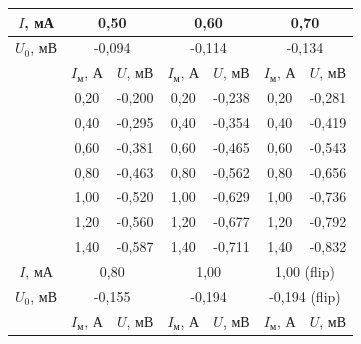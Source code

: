 \documentclass[a4paper,12pt]{article} %
\begin{document}
\begin{table}[H]
\begin{tabular}{l|cc|cc|cc|}
		\multicolumn{1}{|c|}{$I$, мА}   & \multicolumn{2}{c|}{0,50}                      & \multicolumn{2}{c|}{0,60}                      & \multicolumn{2}{c|}{0,70}                      \\ \hline
		\multicolumn{1}{|c|}{$U_0$, мВ} & \multicolumn{2}{c|}{-0,094}                    & \multicolumn{2}{c|}{-0,114}                    & \multicolumn{2}{c|}{-0,134}                    \\ \hline
		& \multicolumn{1}{c|}{$I_\text{м}$, А} & $U$, мВ & \multicolumn{1}{c|}{$I_\text{м}$, А} & $U$, мВ & \multicolumn{1}{c|}{$I_\text{м}$, А} & $U$, мВ \\ \cline{2-7} 
		& \multicolumn{1}{c|}{0,20}            & -0,200  & \multicolumn{1}{c|}{0,20}            & -0,238  & \multicolumn{1}{c|}{0,20}            & -0,281  \\ \cline{2-7} 
		& \multicolumn{1}{c|}{0,40}            & -0,295  & \multicolumn{1}{c|}{0,40}            & -0,354  & \multicolumn{1}{c|}{0,40}            & -0,419  \\ \cline{2-7} 
		& \multicolumn{1}{c|}{0,60}            & -0,381  & \multicolumn{1}{c|}{0,60}            & -0,465  & \multicolumn{1}{c|}{0,60}            & -0,543  \\ \cline{2-7} 
		& \multicolumn{1}{c|}{0,80}            & -0,463  & \multicolumn{1}{c|}{0,80}            & -0,562  & \multicolumn{1}{c|}{0,80}            & -0,656  \\ \cline{2-7} 
		& \multicolumn{1}{c|}{1,00}            & -0,520  & \multicolumn{1}{c|}{1,00}            & -0,629  & \multicolumn{1}{c|}{1,00}            & -0,736  \\ \cline{2-7} 
		& \multicolumn{1}{c|}{1,20}            & -0,560  & \multicolumn{1}{c|}{1,20}            & -0,677  & \multicolumn{1}{c|}{1,20}            & -0,792  \\ \cline{2-7} 
		& \multicolumn{1}{c|}{1,40}            & -0,587  & \multicolumn{1}{c|}{1,40}            & -0,711  & \multicolumn{1}{c|}{1,40}            & -0,832  \\ \hline
		\multicolumn{1}{|c|}{$I$, мА}   & \multicolumn{2}{c|}{0,80}                      & \multicolumn{2}{c|}{1,00}                      & \multicolumn{2}{c|}{1,00 (flip)}                      \\ \hline
		\multicolumn{1}{|c|}{$U_0$, мВ} & \multicolumn{2}{c|}{-0,155}                    & \multicolumn{2}{c|}{-0,194}                    & \multicolumn{2}{c|}{-0,194 (flip)}                    \\ \hline
		& \multicolumn{1}{c|}{$I_\text{м}$, А} & $U$, мВ & \multicolumn{1}{c|}{$I_\text{м}$, А} & $U$, мВ & \multicolumn{1}{c|}{$I_\text{м}$, А} & $U$, мВ \\ \cline{2-7} 

\end{tabular}
\end{table}
\end{document}
